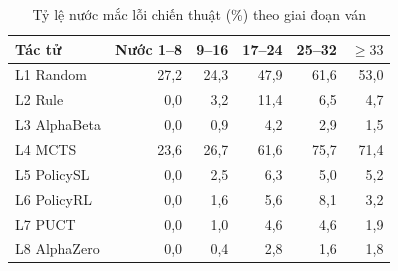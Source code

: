 \begin{table}[H]
  \centering
  \small
  \caption{Tỷ lệ nước mắc lỗi chiến thuật (\%) theo giai đoạn ván}
  \label{tab:cs-nuoc-giaidoan}
  \begin{tabular}{lrrrrr}
    \toprule
    Tác tử & Nước 1--8 & 9--16 & 17--24 & 25--32 & $\ge 33$ \\
    \midrule
    L1 Random & 27,2 & 24,3 & 47,9 & 61,6 & 53,0 \\
    L2 Rule & 0,0 & 3,2 & 11,4 & 6,5 & 4,7 \\
    L3 AlphaBeta & 0,0 & 0,9 & 4,2 & 2,9 & 1,5 \\
    L4 MCTS & 23,6 & 26,7 & 61,6 & 75,7 & 71,4 \\
    L5 PolicySL & 0,0 & 2,5 & 6,3 & 5,0 & 5,2 \\
    L6 PolicyRL & 0,0 & 1,6 & 5,6 & 8,1 & 3,2 \\
    L7 PUCT & 0,0 & 1,0 & 4,6 & 4,6 & 1,9 \\
    L8 AlphaZero & 0,0 & 0,4 & 2,8 & 1,6 & 1,8 \\
    \bottomrule
  \end{tabular}
\end{table}
